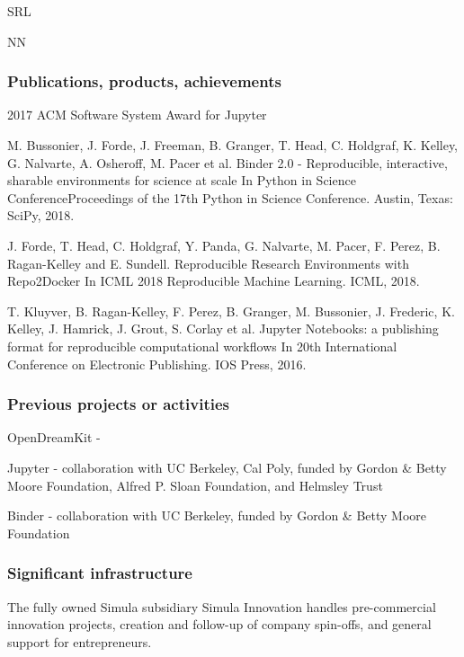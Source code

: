 \begin{sitedescription}{SRL}
\begin{participant}[PM=72, type=R]{NN}
\end{participant}


\subsubsection*{Publications, products, achievements}

\begin{compactenum}
\item 2017 ACM Software System Award for Jupyter
\item M. Bussonier, J. Forde, J. Freeman, B. Granger, T. Head, C. Holdgraf, K.
  Kelley, G. Nalvarte, A. Osheroff, M. Pacer et al. Binder 2.0 - Reproducible,
  interactive, sharable environments for science at scale In Python in Science
  ConferenceProceedings of the 17th Python in Science Conference. Austin,
  Texas: SciPy, 2018.
\item J. Forde, T. Head, C. Holdgraf, Y. Panda, G. Nalvarte, M. Pacer, F.
  Perez, B. Ragan-Kelley and E. Sundell. Reproducible Research Environments
  with Repo2Docker In ICML 2018 Reproducible Machine Learning. ICML, 2018.
\item T. Kluyver, B. Ragan-Kelley, F. Perez, B. Granger, M. Bussonier, J.
  Frederic, K. Kelley, J. Hamrick, J. Grout, S. Corlay et al. Jupyter
  Notebooks: a publishing format for reproducible computational workflows In
  20th International Conference on Electronic Publishing. IOS Press, 2016.

\end{compactenum}

\subsubsection*{Previous projects or activities}

\begin{compactenum}
\item OpenDreamKit -
\item Jupyter - collaboration with UC Berkeley, Cal Poly, funded by Gordon \&
  Betty Moore Foundation, Alfred P. Sloan Foundation, and Helmsley Trust
\item Binder - collaboration with UC Berkeley, funded by Gordon \& Betty Moore
  Foundation
\end{compactenum}

\subsubsection*{Significant infrastructure}

The fully owned Simula subsidiary Simula Innovation handles pre-commercial
innovation projects, creation and follow-up of company spin-offs, and general
support for entrepreneurs.

\end{sitedescription}



